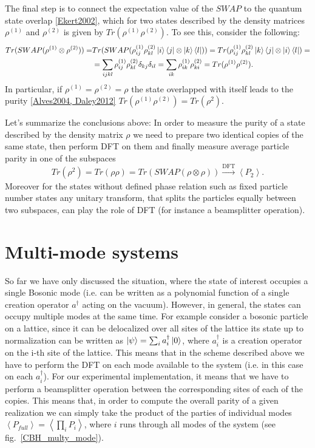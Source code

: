 The final step is to connect the expectation value of the $SWAP$ to the quantum state overlap \ref{Ekert2002}, which for two states described by the density matrices $\rho^{(1)}$ and $\rho^{(2)}$ is given by $Tr(\rho^{(1)} \rho^{(2)})$. To see this, consider the following:
\begin{equation}
\begin{aligned}
Tr(SWAP(\rho^{(1)} \otimes \rho^{(2)})) =& Tr(SWAP(\rho^{(1)}_{ij} \rho^{(2)}_{kl} \left|i\right\rangle\left\langle j\right| \otimes \left|k\right\rangle\left\langle l\right|)) =Tr(\rho^{(1)}_{ij} \rho^{(2)}_{kl} \left|k\right\rangle\left\langle j\right| \otimes \left|i\right\rangle\left\langle l\right|) = \\
&=\sum_{ijkl}\rho^{(1)}_{ij} \rho^{(2)}_{kl} \delta_{kj} \delta_{il} = \sum_{ik}\rho^{(1)}_{ik} \rho^{(2)}_{ki} = Tr(\rho^{(1)} \rho^{(2)}).
\end{aligned}
\end{equation}
In particular, if $\rho^{(1)}=\rho^{(2)}=\rho$ the state overlapped with itself leads to the purity \ref{Alves2004, Daley2012} $Tr(\rho^{(1)} \rho^{(2)}) = Tr(\rho^2)$.

Let's summarize the conclusions above: In order to measure the purity of a state described by the density matrix $\rho$ we need to prepare two identical copies of the same state, then perform DFT on them and finally measure average particle parity in one of the subspaces
\begin{equation}
Tr(\rho^2) = Tr(\rho\rho) = Tr(SWAP(\rho \otimes \rho)) \xrightarrow[]{\text{DFT}} \left< P_2 \right>.
\end{equation}
Moreover for the states without defined phase relation such as fixed particle number states any unitary transform, that splits the particles equally between two subspaces, can play the role of DFT (for instance a beamsplitter operation).

\section{Multi-mode systems}
So far we have only discussed the situation, where the state of interest occupies a single Bosonic mode (i.e. can be written as a polynomial function of a single creation operator $a^{\dagger}$ acting on the vacuum). However, in general, the states can occupy multiple modes at the same time. For example consider a bosonic particle on a lattice, since it can be delocalized over all sites of the lattice its state up to normalization can be written as $\left|\psi\right\rangle = \sum_i a_i^{\dagger} \left|0\right\rangle$, where $a_i^{\dagger}$ is a creation operator on the i-th site of the lattice. This means that in the scheme described above we have to perform the DFT on each mode available to the system (i.e. in this case on each $a_i^{\dagger}$). For our experimental implementation, it means that we have to perform a beamsplitter operation between the corresponding sites of each of the copies. This means that, in order to compute the overall parity of a given realization we can simply take the product of the parties of individual modes $\left<P_{full}\right> = \left< \prod_i P_i \right>$, where $i$ runs through all modes of the system (see fig.~\ref{CBH_multy_mode}).

